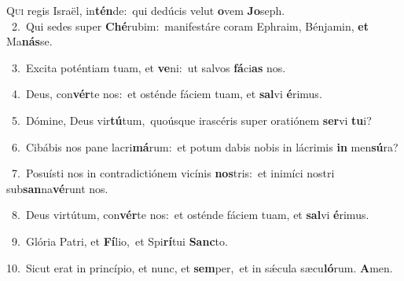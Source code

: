 \lettrine{\initial\textcolor{\initialcolor}{Q}}{ui} regis Israël, in\-\textbf{tén}\-de:~\star qui dedúcis velut \textbf{o}\-vem \textbf{Jo}\-seph.\\
{\numbfont\textcolor{\numbcolor}{~2.}}~Qui sedes super \textbf{Ché}\-rubim:~\star manifestáre coram Ephraim, Bénjamin, \textbf{et} Ma\-\textbf{nás}\-se.\par
{\numbfont\textcolor{\numbcolor}{~3.}}~Excita poténtiam tuam, et \textbf{ve}\-ni:~\star ut salvos \textbf{fá}\-ci\textbf{as} nos.\par
{\numbfont\textcolor{\numbcolor}{~4.}}~Deus, con\-\textbf{vér}\-te nos:~\star et osténde fáciem tuam, et \textbf{sal}\-vi \textbf{é}\-rimus.\par
{\numbfont\textcolor{\numbcolor}{~5.}}~Dómine, Deus vir\-\textbf{tú}\-tum,~\star quoúsque irascéris super oratiónem \textbf{ser}\-vi \textbf{tu}\-i?\par
{\numbfont\textcolor{\numbcolor}{~6.}}~Cibábis nos pane lacri\-\textbf{má}\-rum:~\star et potum dabis nobis in lácrimis \textbf{in} men\-\textbf{sú}\-ra?\par
{\numbfont\textcolor{\numbcolor}{~7.}}~Posuísti nos in contradictiónem vicínis \textbf{nos}\-tris:~\star et inimíci nostri sub\-\textbf{san}\-na\-\textbf{vé}\-runt nos.\par
{\numbfont\textcolor{\numbcolor}{~8.}}~Deus virtútum, con\-\textbf{vér}\-te nos:~\star et osténde fáciem tuam, et \textbf{sal}\-vi \textbf{é}\-rimus.\par
{\numbfont\textcolor{\numbcolor}{~9.}}~Glória Patri, et \textbf{Fí}\-lio,~\star et Spi\-\textbf{rí}\-tui \textbf{Sanc}\-to.\par
{\numbfont\textcolor{\numbcolor}{10.}}~Sicut erat in princípio, et nunc, et \textbf{sem}\-per,~\star et in sǽcula sæcu\-\textbf{ló}\-rum. \textbf{A}\-men.\par
